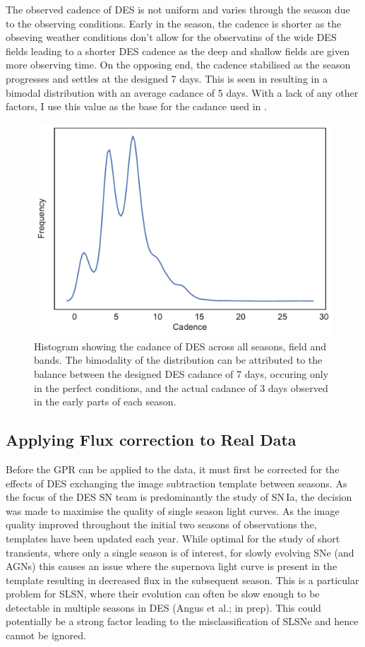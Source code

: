 The observed cadence of DES is not uniform and varies through the season due to the observing conditions. Early in the season, the cadence is shorter as the obseving weather conditions don't allow for the observatins of the wide DES fields leading to a shorter DES cadence as the deep and shallow fields are given more observing time. On the opposing end, the cadence stabilised as the season progresses and settles at the designed 7 days. This is seen in  resulting in a bimodal distribution with an average cadance of 5 days. With a lack of any other factors, I use this value as the base for the cadance used in .

\begin{figure}
  \includegraphics{Figures/Chapter5/Cadence.pdf}
  \caption{Histogram showing the cadance of DES across all seasons, field and bands. The bimodality of the distribution can be attributed to the balance between the designed DES cadance of 7 days, occuring only in the perfect conditions, and the actual cadance of 3 days observed in the early parts of each season.}
  \label{fig:cadence}
\end{figure}

\subsection{Applying Flux correction to Real Data}
Before the GPR can be applied to the data, it must first be corrected for the effects of DES exchanging the image subtraction template between seasons. As the focus of the DES SN team is predominantly the study of SN\,Ia, the decision was made to maximise the quality of single season light curves. As the image quality improved throughout the initial two seasons of observations the, templates have been updated each year. While optimal for the study of short transients, where only a single season is of interest, for slowly evolving SNe (and AGNs) this causes an issue where the supernova light curve is present in the template resulting in decreased flux in the subsequent season. This is a particular problem for SLSN, where their evolution can often be slow enough to be detectable in multiple seasons in DES (Angus et al.; in prep). This could potentially be a strong factor leading to the misclassification of SLSNe and hence cannot be ignored.


